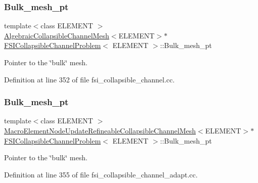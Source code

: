 \subsubsection{\texorpdfstring{Bulk\+\_\+mesh\+\_\+pt}{Bulk\_mesh\_pt}\hspace{0.1cm}{\footnotesize\ttfamily [2/6]}}
{\footnotesize\ttfamily template$<$class E\+L\+E\+M\+E\+NT $>$ \\
\hyperlink{classoomph_1_1AlgebraicCollapsibleChannelMesh}{Algebraic\+Collapsible\+Channel\+Mesh}$<$E\+L\+E\+M\+E\+NT$>$$\ast$ \hyperlink{classFSICollapsibleChannelProblem}{F\+S\+I\+Collapsible\+Channel\+Problem}$<$ E\+L\+E\+M\+E\+NT $>$\+::Bulk\+\_\+mesh\+\_\+pt\hspace{0.3cm}{\ttfamily [private]}}



Pointer to the \char`\"{}bulk\char`\"{} mesh. 



Definition at line 352 of file fsi\+\_\+collapsible\+\_\+channel.\+cc.

\mbox{\label{classFSICollapsibleChannelProblem_a211bcc5fb6076133f46d63bfd827dd3f}} 
\subsubsection{\texorpdfstring{Bulk\+\_\+mesh\+\_\+pt}{Bulk\_mesh\_pt}\hspace{0.1cm}{\footnotesize\ttfamily [3/6]}}
{\footnotesize\ttfamily template$<$class E\+L\+E\+M\+E\+NT $>$ \\
\hyperlink{classoomph_1_1MacroElementNodeUpdateRefineableCollapsibleChannelMesh}{Macro\+Element\+Node\+Update\+Refineable\+Collapsible\+Channel\+Mesh}$<$E\+L\+E\+M\+E\+NT$>$$\ast$ \hyperlink{classFSICollapsibleChannelProblem}{F\+S\+I\+Collapsible\+Channel\+Problem}$<$ E\+L\+E\+M\+E\+NT $>$\+::Bulk\+\_\+mesh\+\_\+pt\hspace{0.3cm}{\ttfamily [private]}}



Pointer to the \char`\"{}bulk\char`\"{} mesh. 



Definition at line 355 of file fsi\+\_\+collapsible\+\_\+channel\+\_\+adapt.\+cc.

